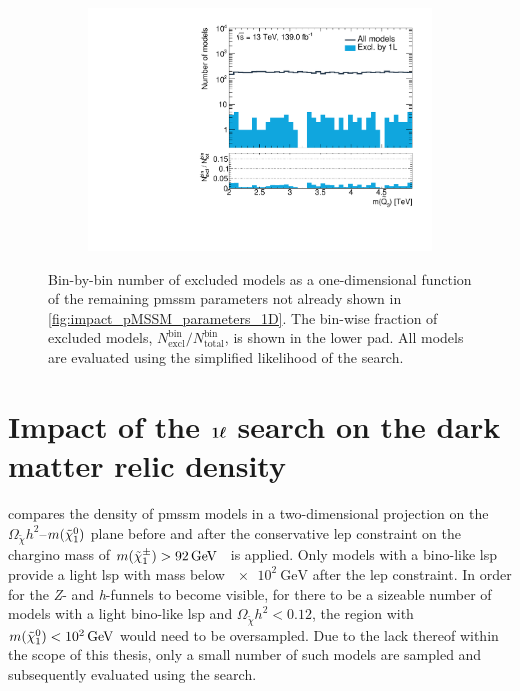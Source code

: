 \begin{figure}
\begin{subfigure}[b]{0.4\linewidth}
	\end{subfigure}
	\begin{subfigure}[b]{0.4\linewidth}
		\centering\includegraphics[width=\textwidth]{1D/mqL3}
	\end{subfigure}
	\caption{Bin-by-bin number of excluded models as a one-dimensional function of the remaining \gls{pmssm} parameters not already shown in \cref{fig:impact_pMSSM_parameters_1D}. The bin-wise fraction of excluded models, $N^\mathrm{bin}_\mathrm{excl} / N^\mathrm{bin}_\mathrm{total}$, is shown in the lower pad. All models are evaluated using the simplified likelihood of the \onelepton search.}
	\label{fig:impact_pMSSM_parameters_1D_2}
\end{figure}


\FloatBarrier

\section[Impact of the \onelepton search on the dark matter relic density]{Impact of the $\makemebold{1\ell}$ search on the dark matter relic density}

 compares the density of \gls{pmssm} models in a two-dimensional projection on the $\Omega_{\tilde{\chi}} h^2$--$m(\tilde{\chi}_1^0)$ plane before and after the conservative \gls{lep} constraint on the chargino mass of $m(\charg) > \SI{92}{\GeV}$~\cite{lep_susy_results} is applied. Only models with a bino-like \gls{lsp} provide a light \gls{lsp} with mass below $\SI{e2}{\GeV}$ after the \gls{lep} constraint. In order for the \textit{Z}- and \textit{h}-funnels to become visible, \ie for there to be a sizeable number of models with a light bino-like \gls{lsp} and $\Omega_{\tilde{\chi}} h^2 < 0.12$, the region with  $m(\lsp) < \SI{e2}{\GeV}$ would need to be oversampled. Due to the lack thereof within the scope of this thesis, only a small number of such models are sampled and subsequently evaluated using the \onelepton search.

